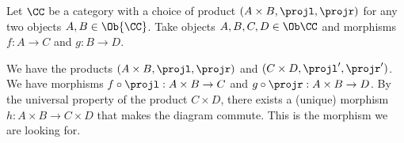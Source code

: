 \begin{solution}\label{sol:product_of_morphisms}
	Let $\CC$ be a category with a choice of product $(A\times B, \projl, \projr)$ for any two objects $A,B\in \Ob{\CC}$. Take objects $ A, B, C, D \in \Ob \CC $ and morphisms $ f: A \to C $ and $ g: B \to D $.

	\begin{center}
	\end{center}

	We have the products $ (A \times B, \projl, \projr) $ and $ (C \times D, \projl^\prime, \projr^\prime) $. We have morphisms $ f \circ \projl: A \times B \to C $ and $ g \circ \projr: A \times B \to D $. By the universal property of the product $ C \times D $, there exists a (unique) morphism $ h: A \times B \to C \times D $ that makes the diagram commute. This is the morphism we are looking for.
\end{solution}

